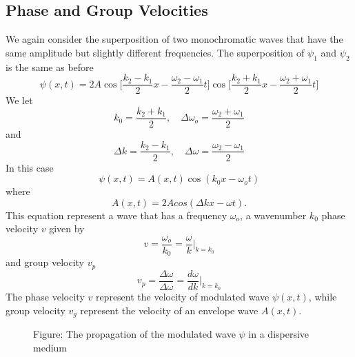\documentclass[../../../main.tex]{subfiles}
\begin{document}
\subsection*{Phase and Group Velocities}
We again consider the superposition of two monochromatic waves that have the same amplitude but slightly different frequencies. The superposition of $\psi_1$ and $\psi_2$ is the same as before 
\begin{equation*}
    \psi(x,t)=2A\cos\bigg[\frac{k_2-k_1}{2}x-\frac{\omega_2-\omega_1}{2}t]\cos\bigg[\frac{k_2+k_1}{2}x-\frac{\omega_2+\omega_1}{2}t\bigg]
\end{equation*}
We let
\begin{equation*}
    k_0=\frac{k_2+k_1}{2},\quad      \Delta\omega_o=\frac{\omega_2+\omega_1}{2}
\end{equation*}
and
\begin{equation*}
    \Delta k=\frac{k_2-k_1}{2},\quad      \Delta\omega=\frac{\omega_2-\omega_1}{2}
\end{equation*}
In this case
\begin{equation*}
    \psi(x,t)=A(x, t) \cos(k_0x - \omega_ot) 
\end{equation*}
where 
\begin{equation*}
    A(x, t)=2A cos( \Delta k x- \omega t).
\end{equation*}
This equation represent a wave that has a frequency $\omega_o$, a wavenumber $k_0$ phase velocity $v$ given by
\begin{equation*}
      v=\frac{\omega_o}{k_0}=\frac{\omega}{k}\bigg|_{k=k_0}
\end{equation*}
and group velocity $v_p$
\begin{equation*}
    v_p=\frac{\Delta\omega}{\Delta\omega}=\frac{d\omega}{dk}\bigg|_{k=k_0}
\end{equation*}
The phase velocity $ v$ represent the velocity of modulated wave $\psi(x,t)$, while group velocity $v_g$ represent the velocity of an envelope wave $A(x,t)$. 

\begin{figure*}
    \centering
    \caption*{Figure: The propagation of the modulated wave $\psi$ in a dispersive medium}
\end{figure*}
\end{document}
